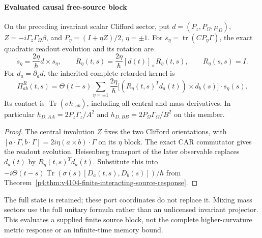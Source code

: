 \documentclass[12pt,a4paper]{article}
\begin{document}
\paragraph{Evaluated causal free-source block}
\begin{proposition}
\label{p4:prop:spherical-dirac-retarded-kernel}
On the preceding invariant scalar Clifford sector, put
\(d=(P_z,P_\Omega,\mu_D)\), \(Z=-i\Gamma_z\Gamma_\Omega\beta\), and
\(P_\eta=(I+\eta Z)/2\), \(\eta=\pm1\). For
\(s_\eta=\operatorname{tr}(CP_\eta\Gamma)\), the exact quadratic readout
evolution and its rotation are
\[
 \dot s_\eta=\frac{2\eta}{\hbar}d\times s_\eta,\qquad
 \dot R_\eta(t,s)=\frac{2\eta}{\hbar}[d(t)]_\times R_\eta(t,s),
 \qquad R_\eta(s,s)=I.
\]
For \(d_a=\partial_a d\), the inherited complete retarded kernel is
\begin{equation}
 \boxed{\Pi^R_{ab}(t,s)=\Theta(t-s)\sum_{\eta=\pm1}\frac{2\eta}{\hbar}
 \big[(R_\eta(t,s)^Td_a(t))\times d_b(s)\big]\cdot s_\eta(s).}
 \label{p4:eq:spherical-dirac-retarded-kernel}
\end{equation}
Its contact is \(\operatorname{Tr}(\sigma h_{,ab})\), including all central
and mass derivatives. In particular
\(h_{D,AA}=2P_z\Gamma_z/A^2\) and
\(h_{D,BB}=2P_\Omega\Gamma_\Omega/B^2\) on this member.
\end{proposition}
\begin{proof}
The central involution \(Z\) fixes the two Clifford orientations, with
\([a\cdot\Gamma,b\cdot\Gamma]=2i\eta(a\times b)\cdot\Gamma\)
on its \(\eta\) block. The exact CAR commutator gives the readout evolution.
Heisenberg transport of the later observable replaces \(d_a(t)\) by
\(R_\eta(t,s)^Td_a(t)\). Substitute this into
\(-i\Theta(t-s)\operatorname{Tr}(\sigma(s)[D_a(t,s),D_b(s)])/\hbar\)
from Theorem~\ref{p4:thm:v4104-finite-interacting-source-response}.
\end{proof}
The full state is retained; these port coordinates do not replace it.
Mixing mass sectors use the full unitary formula rather than an unlicensed
invariant projector. This evaluates a supplied finite source block, not the
complete higher-curvature metric response or an infinite-time memory bound.




\end{document}
